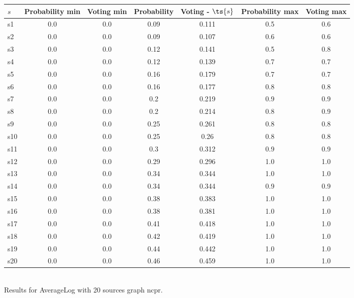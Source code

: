 \documentclass{article}
\begin{document}
\noindent\begin{tabular}{|l|c|c|c|c|c|c|}
\hline
$s$& Probability min & Voting min & Probability & Voting - $\ts{s}$ & Probability max & Voting max\\
\hline
s1 &0.0 & 0.0 & 0.09 & 0.111 & 0.5 & 0.6\\
\hline
s2 &0.0 & 0.0 & 0.09 & 0.107 & 0.6 & 0.6\\
\hline
s3 &0.0 & 0.0 & 0.12 & 0.141 & 0.5 & 0.8\\
\hline
s4 &0.0 & 0.0 & 0.12 & 0.139 & 0.7 & 0.7\\
\hline
s5 &0.0 & 0.0 & 0.16 & 0.179 & 0.7 & 0.7\\
\hline
s6 &0.0 & 0.0 & 0.16 & 0.177 & 0.8 & 0.8\\
\hline
s7 &0.0 & 0.0 & 0.2 & 0.219 & 0.9 & 0.9\\
\hline
s8 &0.0 & 0.0 & 0.2 & 0.214 & 0.8 & 0.9\\
\hline
s9 &0.0 & 0.0 & 0.25 & 0.261 & 0.8 & 0.8\\
\hline
s10 &0.0 & 0.0 & 0.25 & 0.26 & 0.8 & 0.8\\
\hline
s11 &0.0 & 0.0 & 0.3 & 0.312 & 0.9 & 0.9\\
\hline
s12 &0.0 & 0.0 & 0.29 & 0.296 & 1.0 & 1.0\\
\hline
s13 &0.0 & 0.0 & 0.34 & 0.344 & 1.0 & 1.0\\
\hline
s14 &0.0 & 0.0 & 0.34 & 0.344 & 0.9 & 0.9\\
\hline
s15 &0.0 & 0.0 & 0.38 & 0.383 & 1.0 & 1.0\\
\hline
s16 &0.0 & 0.0 & 0.38 & 0.381 & 1.0 & 1.0\\
\hline
s17 &0.0 & 0.0 & 0.41 & 0.418 & 1.0 & 1.0\\
\hline
s18 &0.0 & 0.0 & 0.42 & 0.419 & 1.0 & 1.0\\
\hline
s19 &0.0 & 0.0 & 0.44 & 0.442 & 1.0 & 1.0\\
\hline
s20 &0.0 & 0.0 & 0.46 & 0.459 & 1.0 & 1.0\\
\hline
\end{tabular}\\

\noindent Results for AverageLog with 20 sources graph ncpr.
\end{document}

